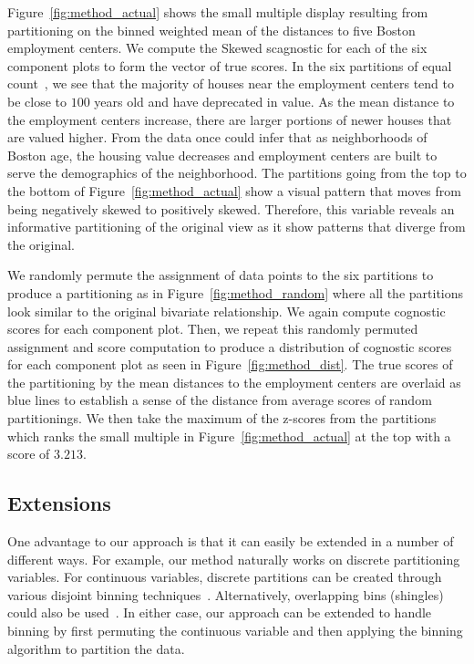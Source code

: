 Figure~\ref{fig:method_actual} shows the small multiple display resulting from partitioning on the binned weighted mean of the distances to five Boston employment centers. We compute the Skewed scagnostic for each of the six component plots to form the vector of true scores. In the six partitions of equal count~\cite{Becker1996}, we see that the majority of houses near the employment centers tend to be close to $100$ years old and have deprecated in value. As the mean distance to the employment centers increase, there are larger portions of newer houses that are valued higher. From the data once could infer that as neighborhoods of Boston age, the housing value decreases and employment centers are built to serve the demographics of the neighborhood. The partitions going from the top to the bottom of Figure~\ref{fig:method_actual} show a visual pattern that moves from being negatively skewed to positively skewed. Therefore, this variable reveals an informative partitioning of the original view as it show patterns that diverge from the original.

We randomly permute the assignment of data points to the six partitions to produce a partitioning as in Figure~\ref{fig:method_random} where all the partitions look similar to the original bivariate relationship. We again compute cognostic scores for each component plot. Then, we repeat this randomly permuted assignment and score computation to produce a distribution of cognostic scores for each component plot as seen in Figure~\ref{fig:method_dist}. The true scores of the partitioning by the mean distances to the employment centers are overlaid as blue lines to establish a sense of the distance from average scores of random partitionings. We then take the maximum of the z-scores from the partitions which ranks the small multiple in Figure~\ref{fig:method_actual} at the top with a score of $3.213$.

\subsection{Extensions}
One advantage to our approach is that it can easily be extended in a number of different ways. For example, our method naturally works on discrete partitioning variables. For continuous variables, discrete partitions can be created through various disjoint binning techniques~\cite{Freedman1981,Scott2009}. Alternatively, overlapping bins (shingles) could also be used~\cite{Becker1996}. In either case, our approach can be extended to handle binning by first permuting the continuous variable and then applying the binning algorithm to partition the data.

